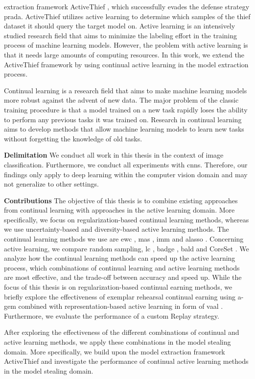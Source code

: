 extraction framework ActiveThief \cite{pal2020activethief}, which successfully evades the defense strategy  \gls{prada}. ActiveThief utilizes active
learning to determine which samples of the thief dataset it should query the target model on. Active learning is an intensively studied research
field that aims to minimize the labeling effort in the training process of machine learning models. However, the problem with active learning is
that it needs large amounts of computing resources. In this work, we extend the ActiveThief framework by using continual active learning in the model
extraction process.\par
Continual learning is a research field that aims to make machine learning models more robust against the advent of new data. The major problem
of the classic training procedure is that a model trained on a new task rapidly loses the ability to perform any previous tasks it was trained on.
Research in continual learning aims to develop methods that allow machine learning models to learn new tasks without forgetting the knowledge of old 
tasks. \par
\textbf{Delimitation} \hspace{0.2cm} We conduct all work in this thesis in the context of image classification. Furthermore, we conduct all experiments
with \glspl{cnn}. Therefore, our findings only apply to deep learning within the computer vision domain and may not generalize to other settings. \par
\textbf{Contributions} \hspace{0.2cm} The objective of this thesis is to combine existing approaches from continual learning
with approaches in the active learning domain. More specifically, we focus on regularization-based continual learning methods,
whereas we use uncertainty-based and diversity-based active learning methods. The continual learning methods we use are \gls{ewc} \cite{kirkpatrick2017overcoming},
\gls{mas} \cite{aljundi2018memory}, \gls{imm} \cite{lee2017overcoming} and \gls{alasso} \cite{park2019continual}.
Concerning active learning, we compare random sampling, \gls{lc} \cite{lewis1995sequential}, \gls{badge} \cite{ash2019deep}, \gls{bald} \cite{houlsby2011bayesian} and
CoreSet \cite{sener2017active}.
We analyze how the continual learning methods can speed up the active learning process, which combinations of continual learning and active learning methods
are most effective, and the trade-off between accuracy and speed up. While the focus of this thesis is on regularization-based continual
earning methods, we briefly explore the effectiveness of exemplar rehearsal continual earning using \gls{a-gem} \cite{chaudhry2018efficient}
combined with representation-based active learning in form of \gls{vaal} \cite{sinha2019variational}. Furthermore, we evaluate the performance of a custom Replay strategy.\par
After exploring the effectiveness of the different combinations of continual and active learning methods, we apply these combinations in the model stealing
domain. More specifically, we build upon the model extraction framework ActiveThief \cite{pal2020activethief} and investigate the performance of continual
active learning methods in the model stealing domain.